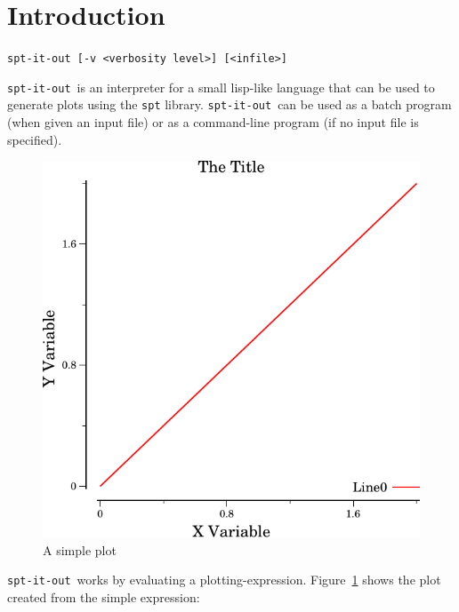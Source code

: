 \documentclass{article}
\title{\sio}
\author{Ethan Burns\\
{\tt burns.ethan at gmail.com}}
\date{\today}
\newcommand{\sio}{{\tt spt-it-out}}
\begin{document}
\maketitle

\section{\label{sect:intro} Introduction}
\begin{center}
{\tt spt-it-out [-v <verbosity level>] [<infile>]}
\end{center}

\sio\ is an interpreter for a small lisp-like language that can be
used to generate plots using the {\tt spt} library.  \sio\ can be used
as a batch program (when given an input file) or as a command-line
program (if no input file is specified).

\begin{figure}[t]
\begin{center}
\includegraphics{simple_plot}
\caption{\label{fig:simp}A simple plot}
\end{center}
\end{figure}

\sio\ works by evaluating a plotting-expression.
Figure~\ref{fig:simp} shows the plot created from the simple
expression:
\end{document}
